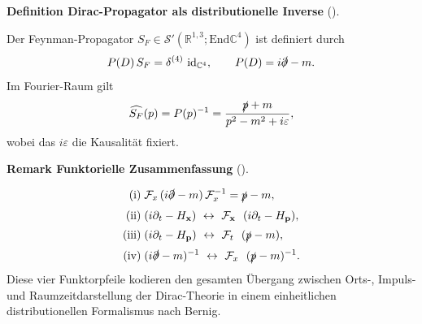 \documentclass[10pt, letterpaper]{article}
\newcommand{\id}{\operatorname{id}}
\newcommand{\R}{\mathbb{R}}
\newcommand{\C}{\mathbb{C}}
\newcommand{\End}{\mathrm{End}}
\newcommand{\CustomHeading}[3]{%
  \par\medskip\noindent%
  \textbf{#1 #2} \textnormal{(#3)}.\enskip%
}
\newenvironment{DEF}[2]{\begin{unitbox}\CustomHeading{Definition}{#1}{#2}}{\end{unitbox}}
\newenvironment{REM}[2]{\begin{unitbox}\CustomHeading{Remark}{#1}{#2}}{\end{unitbox}}
\begin{document}


\begin{DEF}{Dirac-Propagator als distributionelle Inverse}{}
Der Feynman-Propagator $S_F\in\mathcal{S}'(\R^{1,3};\End\C^4)$ ist definiert durch
\[
P(D)\,S_F=\delta^{(4)}\,\id_{\C^4},\qquad P(D)=i\slashed{\partial}-m.
\]
Im Fourier-Raum gilt
\[
\widehat{S_F}(p)=P(p)^{-1}
=\frac{\slashed{p}+m}{p^2-m^2+i\varepsilon},
\]
wobei das $i\varepsilon$ die Kausalität fixiert.

\begin{center}
\end{center}
\end{DEF}




\begin{REM}{Funktorielle Zusammenfassung}{}
\[
\begin{aligned}
\text{(i)}\;& \mathcal{F}_x\,(i\slashed{\partial}-m)\,\mathcal{F}_x^{-1}=\slashed{p}-m,\\[2pt]
\text{(ii)}\;& (i\partial_t-H_{\mathbf{x}})\ \leftrightarrow{\ \mathcal{F}_{\mathbf{x}}\ }\ (i\partial_t-H_{\mathbf{p}}),\\[2pt]
\text{(iii)}\;& (i\partial_t-H_{\mathbf{p}})\ \leftrightarrow{\ \mathcal{F}_t\ }\ (\slashed{p}-m),\\[2pt]
\text{(iv)}\;& (i\slashed{\partial}-m)^{-1}\ \leftrightarrow{\ \mathcal{F}_x\ }\ (\slashed{p}-m)^{-1}.
\end{aligned}
\]
Diese vier Funktorpfeile kodieren den gesamten Übergang zwischen Orts-, Impuls- und Raumzeitdarstellung der Dirac-Theorie in einem einheitlichen distributionellen Formalismus nach Bernig.
\end{REM}

\end{document}
